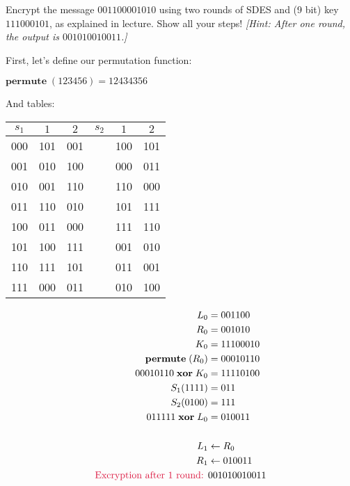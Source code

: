 
\begin{problem}
Encrypt the message $001100001010$ using two rounds of SDES and (9 bit) key
$111000101$, as explained in lecture.  Show all your steps! \emph{[Hint: After one round, the output is $001010010011$.]}
\end{problem}

\begin{Answer}
\bigskip

\newcommand{\perm}[1]{\mathbf{permute}\;(#1)}
\newcommand{\xor}[1]{\;\mathbf{xor}\; #1}

First, let's define our permutation function:

\noindent
$\perm{123456} = 12434356$

\bigskip
\noindent
And tables:

\centering
\begin{tabular}{||c | c | c  | c | c | c ||} 
\hline
  $s_{1}$ & $1$ & $2$ & $s_{2}$ & $1$ & $2$\\
\hline
  000 & 101 & 001 &   & 100 & 101\\
\hline
  001 & 010 & 100 &   & 000 & 011\\
\hline
  010 & 001 & 110 &   & 110 & 000\\
\hline
  011 & 110 & 010 &   & 101 & 111\\
\hline
  100 & 011 & 000 &   & 111 & 110\\
\hline
  101 & 100 & 111 &   & 001 & 010\\
\hline
  110 & 111 & 101 &   & 011 & 001\\
\hline
  111 & 000 & 011 &   & 010 & 100\\
\hline
\end{tabular}
\bigskip
\flushleft{}
\begin{multicols}{2}

\begin{align*}
L_{0} &= 001100\\
R_{0} &= 001010\\
K_{0} &= 11100010\\
\perm{R_{0}} &= 00010110\\
00010110 \xor K_{0} &= 11110100\\
S_{1}(1111) &= 011\\
S_{2}(0100) &= 111\\
011111 \xor L_{0} &= 010011\\
\\
L_{1} &\gets R_{0}\\
R_{1} &\gets 010011\\
\text{\crim{Excryption after 1 round: }} &001010010011\\
\end{align*}


\end{multicols}
\end{Answer}
